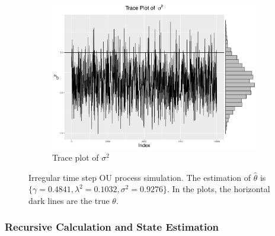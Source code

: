 \begin{figure}[h]
\begin{subfigure}[b]{0.3\textwidth}
    \includegraphics[width=\textwidth]{Chapters/05MCMCOU/plots/simudataOUtracesig2.pdf}
     \caption{Trace plot of $\sigma^2$}
\end{subfigure}
\caption{Irregular time step OU process simulation. The estimation of $\hat{\theta}$ is $\{\gamma=0.4841, \lambda^2=0.1032, \sigma^2=0.9276\}$. In the plots, the horizontal dark lines are the true $\theta$. }
\label{simuOUmarginplots}
\end{figure}



\subsubsection*{Recursive Calculation and State Estimation}

